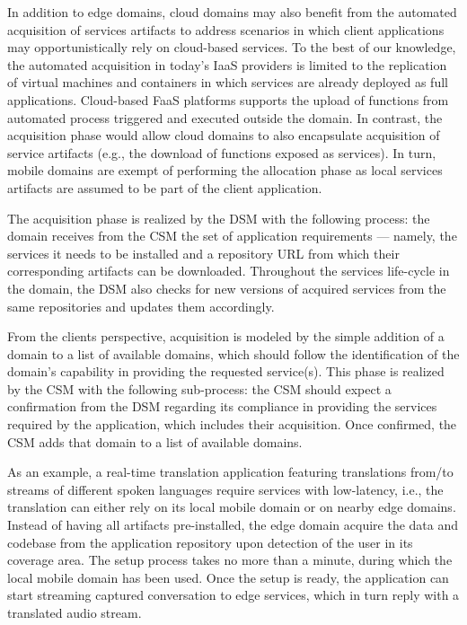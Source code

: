 In addition to edge domains, cloud domains may also benefit from the automated acquisition of services artifacts to address scenarios in which client applications may opportunistically rely on cloud-based services. To the best of our knowledge, the automated acquisition in today's IaaS providers is limited to the replication of virtual machines and containers in which services are already deployed as full applications. Cloud-based FaaS platforms supports the upload of functions from automated process triggered and executed outside the domain. In contrast, the acquisition phase would allow cloud domains to also encapsulate acquisition of service artifacts (e.g., the download of functions exposed as services). In turn, mobile domains are exempt of performing the allocation phase as local services artifacts are assumed to be part of the client application.

The acquisition phase is realized by the DSM with the following process: the domain receives from the CSM the set of application requirements --- namely, the services it needs to be installed and a repository URL from which their corresponding artifacts can be downloaded. Throughout the services life-cycle in the domain, the DSM also checks for new versions of acquired services from the same repositories and updates them accordingly. 

From the clients perspective, acquisition is modeled by the simple addition of a domain to a list of available domains, which should follow the identification of the domain's capability in providing the requested service(s). This phase is realized by the CSM with the following sub-process: the CSM should expect a confirmation from the DSM regarding its compliance in providing the services required by the application, which includes their acquisition. Once confirmed, the CSM adds that domain to a list of available domains. 

As an example, a real-time translation application featuring translations from/to streams of different spoken languages require services with low-latency, i.e., the translation can either rely on its local mobile domain or on nearby edge domains. Instead of having all artifacts pre-installed, the edge domain acquire the data and codebase from the application repository upon detection of the user in its coverage area. The setup process takes no more than a minute, during which the local mobile domain has been used. Once the setup is ready, the application can start streaming captured conversation to edge services, which in turn reply with a translated audio stream.

